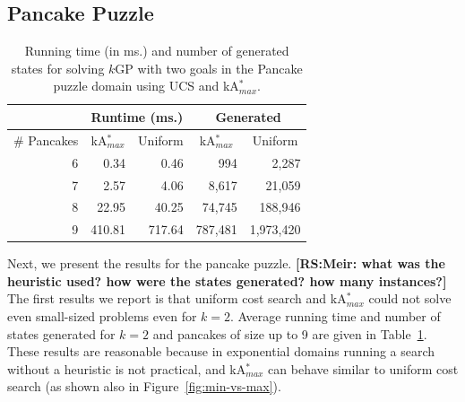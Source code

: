 \documentclass{aicom2e}
\newcommand{\kgs}{$k$GP}
\newcommand{\kastar}{kA$^*$}
\newcommand{\kastarmax}{kA$^*_{max}$}
\newcommand{\kxastar}{k$\times$A$^*$}
\newcommand{\roni}[1]{\textbf{[RS:#1]}}
\begin{document}


\subsection{Pancake Puzzle}

\begin{table}[]
    \centering
    \begin{tabular}{|r|r|r|r|r|}
    \hline
        \multicolumn{1}{|l|}{}            & \multicolumn{2}{c|}{Runtime (ms.)}                                       & \multicolumn{2}{c|}{Generated} \\ \hline
        \multicolumn{1}{|c|}{\# Pancakes} & \multicolumn{1}{c}{\kastarmax{}} & \multicolumn{1}{c|}{Uniform} & \multicolumn{1}{c}{\kastarmax{}} & \multicolumn{1}{c|}{Uniform} \\ \hline
        6                               & 0.34                                      & 0.46                        & 994                                       & 2,287                       \\
        7                               & 2.57                                      & 4.06                        & 8,617                                     & 21,059                      \\
        8                               & 22.95                                     & 40.25                       & 74,745                                    & 188,946                     \\
        9                               & 410.81                                    & 717.64                      & 787,481                                   &
        1,973,420\\
        \hline
    \end{tabular}
    \caption{Running time (in ms.) and number of generated states for solving \kgs{} with two goals
        in the Pancake puzzle domain using UCS and \kastarmax{}.}
\label{tab:pancake-max-uniform}
\end{table}

Next, we present the results for the pancake puzzle.
\roni{Meir: what was the heuristic used? how were the states generated? how many instances?}
The first results we report is that uniform cost search and \kastarmax{}
could not solve even small-sized problems even for $k=2$. Average running time and number of states generated  for $k=2$ and pancakes of size up to 9 are given in Table~\ref{tab:pancake-max-uniform}. These results are reasonable because in exponential domains running a search without a heuristic is not practical, and \kastarmax{} can behave similar to uniform cost search (as shown also in Figure~\ref{fig:min-vs-max}).
\end{document}
